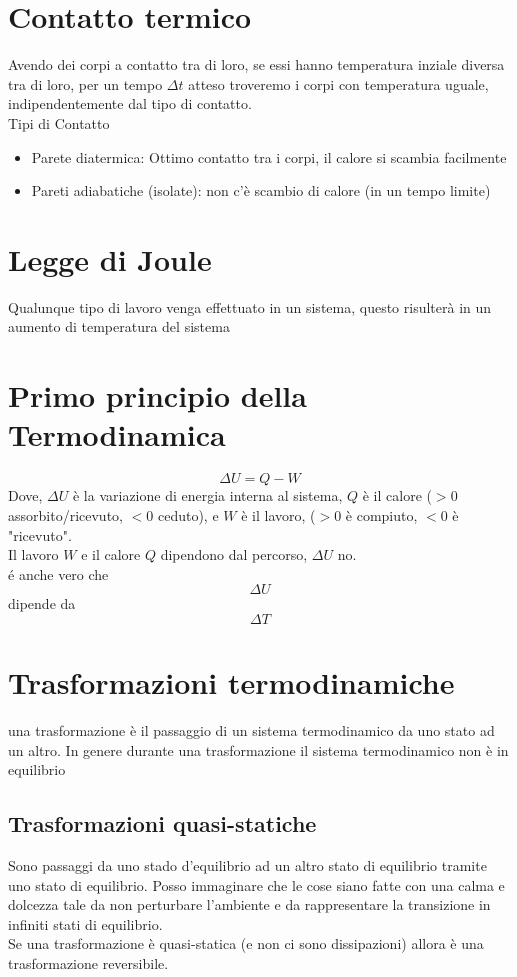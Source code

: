 \documentclass[a4paper]{report}
\begin{document}
  \section{Contatto termico}
  Avendo dei corpi a contatto tra di loro, se essi hanno temperatura inziale diversa tra di loro, per un tempo $\Delta t$ atteso troveremo i corpi con temperatura uguale, indipendentemente dal tipo di contatto.\\
  Tipi di Contatto
  \begin{itemize}
    \item Parete diatermica: Ottimo contatto tra i corpi, il calore si scambia facilmente
    \item Pareti adiabatiche (isolate): non c'è scambio di calore (in un tempo limite)
  \end{itemize}

  \section{Legge di Joule}
  Qualunque tipo di lavoro venga effettuato in un sistema, questo risulterà in un aumento di temperatura del sistema


  \section{Primo principio della Termodinamica}
  $$ \Delta U = Q - W $$
  Dove, $\Delta U$ è la variazione di energia interna al sistema, $Q$ è il calore ($>0$ assorbito/ricevuto, $<0$ ceduto), e $W$ è il lavoro, ($>0$ è compiuto, $<0$ è "ricevuto".\\
  Il lavoro $W$ e il calore $Q$ dipendono dal percorso, $\Delta U$ no.\\
  é anche vero che
  $$\Delta U$$ dipende da $$\Delta T$$

  \section{Trasformazioni termodinamiche}
  una trasformazione è il passaggio di un sistema termodinamico da uno stato ad un altro. In genere durante una trasformazione il sistema termodinamico non è in equilibrio

  \subsection{Trasformazioni quasi-statiche}
  Sono passaggi da uno stado d'equilibrio ad un altro stato di equilibrio tramite uno stato di equilibrio. Posso immaginare che le cose siano fatte con una calma e dolcezza tale da non perturbare l'ambiente e da rappresentare la transizione in infiniti stati di equilibrio.\\
  Se una trasformazione è quasi-statica (e non ci sono dissipazioni) allora è una trasformazione reversibile.
\end{document}
